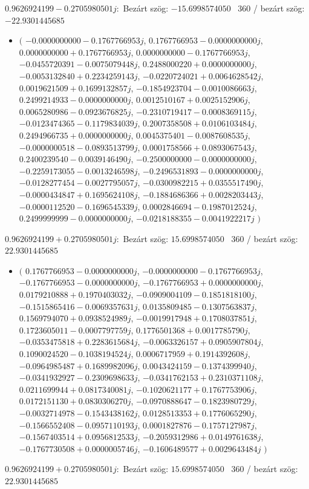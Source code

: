 \documentclass[14pt,a4paper]{article}
\begin{document}
$0.9626924199-0.2705980501j$:\
Bezárt szög: $-15.6998574050$ \
360 / bezárt szög: $-22.9301445685$\
\begin{itemize}
\item
$\big($
$-0.0000000000-0.1767766953j$, $0.1767766953-0.0000000000j$, $0.0000000000+0.1767766953j$, $0.0000000000-0.1767766953j$, $-0.0455720391-0.0075079448j$, $0.2488000220+0.0000000000j$, $-0.0053132840+0.2234259143j$, $-0.0220724021+0.0064628542j$, $0.0019621509+0.1699132857j$, $-0.1854923704-0.0010086663j$, $0.2499214933-0.0000000000j$, $0.0012510167+0.0025152906j$, $0.0065280986-0.0923676825j$, $-0.2310719417-0.0008369115j$, $-0.0123474365-0.1179834039j$, $0.2007358508+0.0106103484j$, $0.2494966735+0.0000000000j$, $0.0045375401-0.0087608535j$, $-0.0000000518-0.0893513799j$, $0.0001758566+0.0893067543j$, $0.2400239540-0.0039146490j$, $-0.2500000000-0.0000000000j$, $-0.2259173055-0.0013246598j$, $-0.2496531893-0.0000000000j$, $-0.0128277454-0.0027795057j$, $-0.0300982215+0.0355517490j$, $-0.0000434847+0.1695624108j$, $-0.1884686366+0.0028203443j$, $-0.0000112520-0.1696545339j$, $0.0002846694-0.1987012524j$, $0.2499999999-0.0000000000j$, $-0.0218188355-0.0041922217j$
$\big)$
\end{itemize}
$0.9626924199+0.2705980501j$:\
Bezárt szög: $15.6998574050$ \
360 / bezárt szög: $22.9301445685$\
\begin{itemize}
\item
$\big($
$0.1767766953-0.0000000000j$, $-0.0000000000-0.1767766953j$, $-0.1767766953-0.0000000000j$, $-0.1767766953+0.0000000000j$, $0.0179210888+0.1970403032j$, $-0.0909004109-0.1851818100j$, $-0.1515865416-0.0069357631j$, $0.0135809485-0.1307563837j$, $0.1569794070+0.0938524989j$, $-0.0019917948+0.1708037851j$, $0.1723605011-0.0007797759j$, $0.1776501368+0.0017785790j$, $-0.0353475818+0.2283615684j$, $-0.0063326157+0.0905907804j$, $0.1090024520-0.1038194524j$, $0.0006717959+0.1914392608j$, $-0.0964985487+0.1689982096j$, $0.0043424159-0.1374399940j$, $-0.0341932927-0.2309698633j$, $-0.0341762153+0.2310371108j$, $0.0211699944+0.0817340081j$, $-0.1020621177+0.1767753906j$, $0.0172151130+0.0830306270j$, $-0.0970888647-0.1823980729j$, $-0.0032714978-0.1543438162j$, $0.0128513353+0.1776065290j$, $-0.1566552408-0.0957110193j$, $0.0001827876-0.1757127987j$, $-0.1567403514+0.0956812533j$, $-0.2059312986+0.0149761638j$, $-0.1767730508+0.0000005746j$, $-0.1606489577+0.0029643484j$
$\big)$
\end{itemize}
$0.9626924199+0.2705980501j$:\
Bezárt szög: $15.6998574050$ \
360 / bezárt szög: $22.9301445685$\
\end{document}
